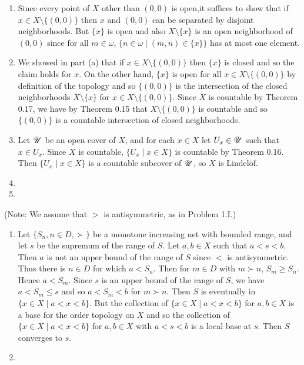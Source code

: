 \begin{prob}
\begin{enumerate}
\item Since every point of $X$ other than $(0, 0)$ is open,it suffices to show that if $x \in X\setminus\{(0, 0)\}$ then $x$ and $(0, 0)$ can be separated by disjoint neighborhoods. But $\{x\}$ is open and also $X\setminus\{x\}$ is an open neighborhood of $(0, 0)$ since for all $m \in \omega$, $\{n \in \omega\mid (m, n) \in \{x\}\}$ has at most one element.

\item We showed in part (a) that if $x \in X\setminus\{(0, 0)\}$ then $\{x\}$ is closed and so the claim holds for $x$. On the other hand, $\{x\}$ is open for all $x \in X\setminus\{(0, 0)\}$ by definition of the topology and so $\{(0, 0)\}$ is the intersection of the closed neighborhoods $X\setminus\{x\}$ for $x \in X\setminus\{(0, 0)\}$. Since $X$ is countable by Theorem 0.17, we have by Theorem 0.15 that $X\setminus\{(0, 0)\}$ is countable and so $\{(0, 0)\}$ is a countable intersection of closed neighborhoods.

\item Let $\mathscr{U}$ be an open cover of $X$, and for each $x \in X$ let $U_x \in \mathscr{U}$ such that $x \in U_x$. Since $X$ is countable, $\{U_x\mid x \in X\}$ is countable by Theorem 0.16. Then $\{U_x\mid x \in X\}$ is a countable subcover of $\mathscr{U}$, so $X$ is Lindelöf.

\item 

\item 
\end{enumerate}
\end{prob}

\begin{prob}
(Note: We assume that $>$ is antisymmetric, as in Problem 1.I.)
\begin{enumerate}
\item Let $\{S_n, n \in D, \succ\}$ be a monotone increasing net with bounded range, and let $s$ be the supremum of the range of $S$. Let $a, b \in X$ such that $a < s < b$. Then $a$ is not an upper bound of the range of $S$ since $<$ is antisymmetric. Thus there is $n \in D$ for which $a < S_n$. Then for $m \in D$ with $m \succ n$, $S_m \geq S_n$. Hence $a < S_m$. Since $s$ is an upper bound of the range of $S$, we have $a < S_m \leq s$ and so $a < S_m < b$ for $m \succ n$. Then $S$ is eventually in $\{x \in X\mid a < x < b\}$. But the collection of $\{x \in X\mid a < x < b\}$ for $a, b \in X$ is a base for the order topology on $X$ and so the collection of $\{x \in X\mid a < x < b\}$ for $a, b \in X$ with $a < s < b$ is a local base at $s$. Then $S$ converges to $s$.

\item 
\end{enumerate}
\end{prob}

